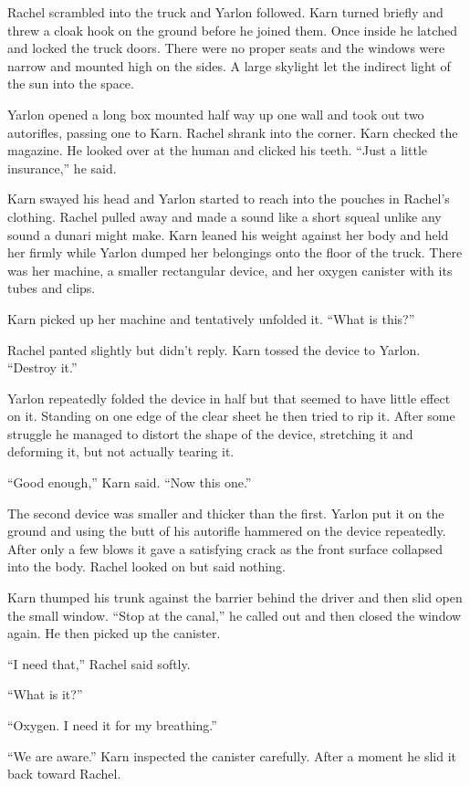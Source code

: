 Rachel scrambled into the truck and Yarlon followed. Karn turned briefly and threw a cloak hook
on the ground before he joined them. Once inside he latched and locked the truck doors. There
were no proper seats and the windows were narrow and mounted high on the sides. A large skylight
let the indirect light of the sun into the space.

Yarlon opened a long box mounted half way up one wall and took out two autorifles, passing one
to Karn. Rachel shrank into the corner. Karn checked the magazine. He looked over at the human
and clicked his teeth. ``Just a little insurance,'' he said.

Karn swayed his head and Yarlon started to reach into the pouches in Rachel's clothing. Rachel
pulled away and made a sound like a short squeal unlike any sound a dunari might make. Karn
leaned his weight against her body and held her firmly while Yarlon dumped her belongings onto
the floor of the truck. There was her machine, a smaller rectangular device, and her oxygen
canister with its tubes and clips.

Karn picked up her machine and tentatively unfolded it. ``What is this?''

Rachel panted slightly but didn't reply. Karn tossed the device to Yarlon. ``Destroy it.''

Yarlon repeatedly folded the device in half but that seemed to have little effect on it.
Standing on one edge of the clear sheet he then tried to rip it. After some struggle he managed
to distort the shape of the device, stretching it and deforming it, but not actually tearing it.

``Good enough,'' Karn said. ``Now this one.''

The second device was smaller and thicker than the first. Yarlon put it on the ground and using
the butt of his autorifle hammered on the device repeatedly. After only a few blows it gave a
satisfying crack as the front surface collapsed into the body. Rachel looked on but said
nothing.

Karn thumped his trunk against the barrier behind the driver and then slid open the small
window. ``Stop at the canal,'' he called out and then closed the window again. He then picked up
the canister.

``I need that,'' Rachel said softly.

``What is it?''

``Oxygen. I need it for my breathing.''

``We are aware.'' Karn inspected the canister carefully. After a moment he slid it back toward
Rachel.

